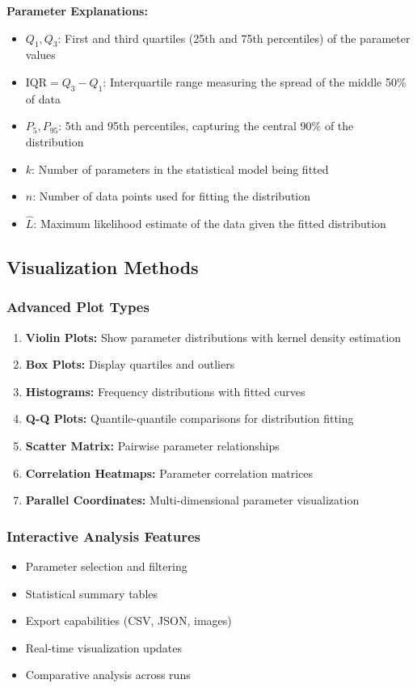 \documentclass[12pt,a4paper]{article}
\begin{document}
\textbf{Parameter Explanations:}
\begin{itemize}
\item $Q_1, Q_3$: First and third quartiles (25th and 75th percentiles) of the parameter values
\item $\text{IQR} = Q_3 - Q_1$: Interquartile range measuring the spread of the middle 50\% of data
\item $P_5, P_{95}$: 5th and 95th percentiles, capturing the central 90\% of the distribution
\item $k$: Number of parameters in the statistical model being fitted
\item $n$: Number of data points used for fitting the distribution
\item $\hat{L}$: Maximum likelihood estimate of the data given the fitted distribution
\end{itemize}

\subsection{Visualization Methods}
\subsubsection{Advanced Plot Types}
\begin{enumerate}
\item \textbf{Violin Plots:} Show parameter distributions with kernel density estimation
\item \textbf{Box Plots:} Display quartiles and outliers
\item \textbf{Histograms:} Frequency distributions with fitted curves
\item \textbf{Q-Q Plots:} Quantile-quantile comparisons for distribution fitting
\item \textbf{Scatter Matrix:} Pairwise parameter relationships
\item \textbf{Correlation Heatmaps:} Parameter correlation matrices
\item \textbf{Parallel Coordinates:} Multi-dimensional parameter visualization
\end{enumerate}

\subsubsection{Interactive Analysis Features}
\begin{itemize}
\item Parameter selection and filtering
\item Statistical summary tables
\item Export capabilities (CSV, JSON, images)
\item Real-time visualization updates
\item Comparative analysis across runs
\end{itemize}
\end{document}

